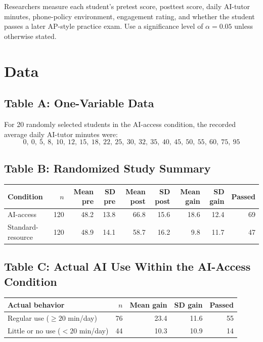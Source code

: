 \documentclass[11pt]{article}
\begin{document}
Researchers measure each student's pretest score, posttest score,
daily AI-tutor minutes, phone-policy environment, engagement rating,
and whether the student passes a later AP-style practice exam. Use a
significance level of $\alpha = 0.05$ unless otherwise stated.

\section{Data}

\subsection*{Table A: One-Variable Data}
For 20 randomly selected students in the AI-access condition, the
recorded average daily AI-tutor minutes were:
\[
0,\ 0,\ 5,\ 8,\ 10,\ 12,\ 15,\ 18,\ 22,\ 25,\ 30,\ 32,\ 35,\ 40,\ 45,\ 50,\ 55,\ 60,\ 75,\ 95
\]

\subsection*{Table B: Randomized Study Summary}
\begin{center}
\small
\begin{tabular}{lrrrrrrrr}
\toprule
Condition & $n$ & Mean pre & SD pre & Mean post & SD post & Mean gain & SD gain & Passed \\
\midrule
AI-access          & 120 & 48.2 & 13.8 & 66.8 & 15.6 & 18.6 & 12.4 & 69 \\
Standard-resource  & 120 & 48.9 & 14.1 & 58.7 & 16.2 &  9.8 & 11.7 & 47 \\
\bottomrule
\end{tabular}
\end{center}

\subsection*{Table C: Actual AI Use Within the AI-Access Condition}
\begin{center}
\small
\begin{tabular}{lrrrr}
\toprule
Actual behavior & $n$ & Mean gain & SD gain & Passed \\
\midrule
Regular use ($\geq 20$ min/day)        & 76 & 23.4 & 11.6 & 55 \\
Little or no use ($< 20$ min/day)      & 44 & 10.3 & 10.9 & 14 \\
\bottomrule
\end{tabular}
\end{center}
\end{document}
